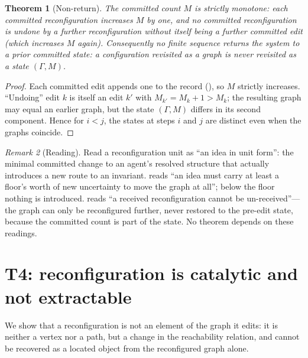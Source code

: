 \documentclass[11pt,a4paper]{article}
\theoremstyle{thmstyle}
\newtheorem{theorem}{Theorem}[section]
\theoremstyle{definition}
\theoremstyle{remark}
\newtheorem{remark}[theorem]{Remark}
\newcommand{\Gph}{\Gamma}
\newcommand{\rec}{M}                %
\begin{document}
\begin{theorem}[Non-return]
\label{thm:nonreturn}
The committed count $\rec$ is strictly monotone: each committed
reconfiguration increases $\rec$ by one, and no committed reconfiguration is
undone by a further reconfiguration without itself being a further committed
edit (which increases $\rec$ again). Consequently no finite sequence returns
the system to a prior committed state: a configuration revisited as a
\emph{graph} is never revisited as a \emph{state} $(\Gph,\rec)$.
\end{theorem}

\begin{proof}
Each committed edit appends one to the record (), so $\rec$
strictly increases. ``Undoing'' edit $k$ is itself an edit $k'$ with
$\rec_{k'}=\rec_k+1>\rec_k$; the resulting graph may equal an earlier graph,
but the state $(\Gph,\rec)$ differs in its second component. Hence for
$i<j$, the states at steps $i$ and $j$ are distinct even when the graphs
coincide.
\end{proof}

\begin{remark}[Reading]
\label{rem:unit-read}
Read a reconfiguration unit as ``an idea in unit form'': the minimal
committed change to an agent's resolved structure that actually introduces a
new route to an invariant.  reads ``an idea must carry
at least a floor's worth of new uncertainty to move the graph at all''; below
the floor nothing is introduced.  reads ``a received
reconfiguration cannot be un-received''---the graph can only be reconfigured
further, never restored to the pre-edit state, because the committed count
is part of the state. No theorem depends on these readings.
\end{remark}

\section{T4: reconfiguration is catalytic and not extractable}
\label{sec:catalyst}

We show that a reconfiguration is not an element of the graph it edits: it is
neither a vertex nor a path, but a change in the reachability relation, and
cannot be recovered as a located object from the reconfigured graph alone.
\end{document}

